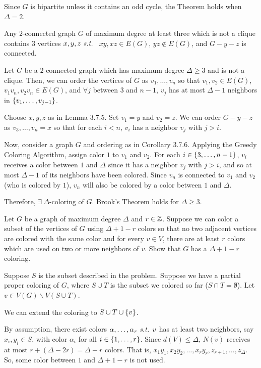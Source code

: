 \begin{prf}
	Since $G$ is bipartite unless it contains an odd cycle, the Theorem holds when $\Delta=2$.
	\begin{lem}{}
		Any $2$-connected graph $G$ of maximum degree at least three which is not a clique contains $3$ vertices $x,y,z\emph{ s.t. }$ $xy,xz\in E(G)$, $yz\notin E(G)$, and $G-y-z$ is connected. 
	\end{lem}
	\begin{cor}{}
		Let $G$ be a $2$-connected graph which has maximum degree $\Delta\geq3$ and is not a clique. Then, we can order the vertices of $G$ as $v_1,\dots,v_n$ so that $v_1,v_2\in E(G)$, $v_1v_n, v_2v_n\in E(G)$, and $\forall j$ between $3$ and $n-1$, $v_j$ has at most $\Delta-1$ neighbors in $\qty{v_1,\dots,v_{j-1}}$.	
	\end{cor}
	\begin{prf*}
		Choose $x,y,z$ as in Lemma 3.7.5. Set $v_1=y$ and $v_2=z$. We can order $G-y-z$ as $v_3,\dots,v_n=x$ so that for each $i<n$, $v_i$ has a neighbor $v_j$ with $j>i$.
	\end{prf*}
	Now, consider a graph $G$ and ordering as in Corollary 3.7.6. Applying the Greedy Coloring Algorithm, assign color $1$ to $v_1$ and $v_2$. For each $i\in\qty{3,\dots,n-1}$, $v_i$ receives a color between $1$ and $\Delta$ since it has a neighbor $v_j$ with $j>i$, and so at most $\Delta-1$ of its neighbors have been colored. Since $v_n$ is connected to $v_1$ and $v_2$ (who is colored by $1$), $v_n$ will also be colored by a color between $1$ and $\Delta$. \par 
	Therefore, $\exists\ \Delta$-coloring of $G$. Brook's Theorem holds for $\Delta\geq3$.
\end{prf}
\begin{eg}
	Let $G$ be a graph of maximum degree $\Delta$ and $r\in{\mathbb{Z}}$. Suppose we can color a subset of the vertices of $G$ using $\Delta+1-r$ colors so that no two adjacent vertices are colored with the same color and for every $v\in V$, there are at least $r$ colors which are used on two or more neighbors of $v$. Show that $G$ has a $\Delta+1-r$ coloring. 
\end{eg}
\begin{prf}
	Suppose $S$ is the subset described in the problem. Suppose we have a partial proper coloring of $G$, where $S\cup T$ is the subset we colored so far ($S\cap T=\emptyset$). Let $v\in V(G)\backslash V(S\cup T)$. 
	\begin{clm}
		We can extend the coloring to $S\cup T\cup\qty{v}$.
	\end{clm}
	By assumption, there exist colors $\alpha,\dots,\alpha_r\emph{ s.t. } v$ has at least two neighbors, say $x_i,y_i\in S$, with color $\alpha_i$ for all $i\in\qty{1,\dots,r}$. Since $d(V)\leq\Delta$, $N(v)$ receives at most $r+(\Delta-2r)=\Delta-r$ colors. That is, $x_1y_1,x_2y_2,\dots,x_ry_r,z_{r+1},\dots,z_{\Delta}$. So, some color between $1$ and $\Delta+1-r$ is not used.  
\end{prf}



